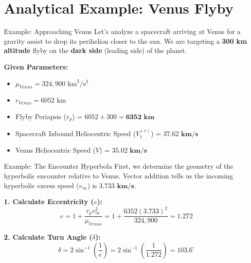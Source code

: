 \documentclass[11pt]{beamer}
\begin{document}
\section{Analytical Example: Venus Flyby}

\begin{frame}{Example: Approaching Venus}
    Let's analyze a spacecraft arriving at Venus for a gravity assist to drop its perihelion closer to the sun. We are targeting a \textbf{300 km altitude} flyby on the \textbf{dark side} (leading side) of the planet.
    
    \vspace{0.2cm}
    \textbf{Given Parameters:}
    \begin{itemize}
        \item $\mu_{Venus} = 324,900 \text{ km}^3/\text{s}^2$
        \item $r_{Venus} = 6052 \text{ km}$
        \item Flyby Periapsis ($r_p$) = $6052 + 300 = \mathbf{6352 \text{ km}}$
        \item Spacecraft Inbound Heliocentric Speed ($V_1^{(v)}$) = $\mathbf{37.62 \text{ km/s}}$
        \item Venus Heliocentric Speed ($V$) = $\mathbf{35.02 \text{ km/s}}$
    \end{itemize}
\end{frame}

\begin{frame}{Example: The Encounter Hyperbola}
    First, we determine the geometry of the hyperbolic encounter relative to Venus. Vector addition tells us the incoming hyperbolic excess speed ($v_\infty$) is $\mathbf{3.733 \text{ km/s}}$.
    
    \vspace{0.2cm}
    \textbf{1. Calculate Eccentricity ($e$):}
    \begin{equation}
        e = 1 + \frac{r_p v_\infty^2}{\mu_{Venus}} = 1 + \frac{6352 (3.733)^2}{324,900} = \mathbf{1.272}
    \end{equation}
   
    
    \textbf{2. Calculate Turn Angle ($\delta$):}
    \begin{equation}
        \delta = 2 \sin^{-1}\left(\frac{1}{e}\right) = 2 \sin^{-1}\left(\frac{1}{1.272}\right) = \mathbf{103.6^\circ}
    \end{equation}
   
\end{frame}
\end{document}
